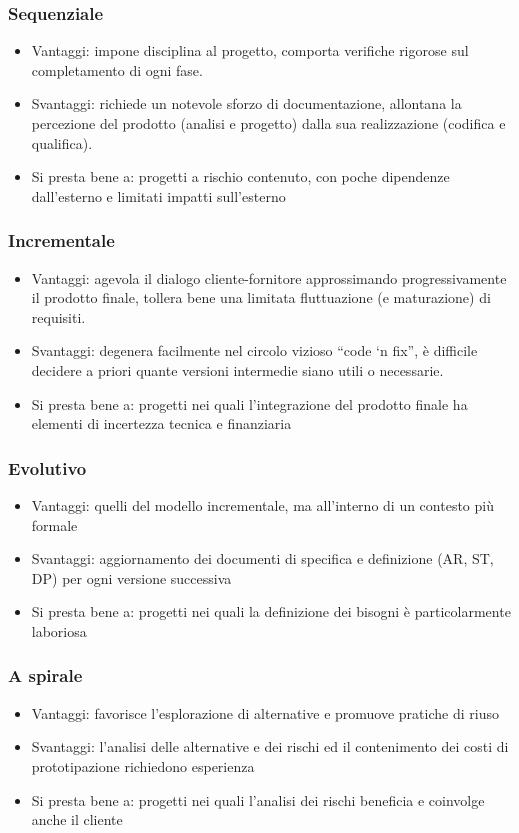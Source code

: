 \subsubsection{Sequenziale}
\begin{itemize}
\item Vantaggi: impone disciplina al progetto, comporta verifiche rigorose sul completamento di ogni fase.
\item Svantaggi: richiede un notevole sforzo di documentazione, allontana la percezione del prodotto (analisi e
progetto) dalla sua realizzazione (codifica e qualifica).
\item Si presta bene a: progetti a rischio contenuto, con poche dipendenze dall'esterno e limitati impatti
sull'esterno
\end{itemize}

\subsubsection{Incrementale}
\begin{itemize}
\item Vantaggi: agevola il dialogo cliente-fornitore approssimando progressivamente il prodotto finale, tollera bene una limitata fluttuazione (e maturazione) di requisiti.
\item Svantaggi: degenera facilmente nel circolo vizioso ``code ‘n fix'', è difficile decidere a priori quante versioni intermedie siano utili o necessarie.
\item Si presta bene a: progetti nei quali l'integrazione del prodotto finale ha elementi di incertezza tecnica e finanziaria
\end{itemize}

\subsubsection{Evolutivo}
\begin{itemize}
\item Vantaggi: quelli del modello incrementale, ma all'interno di un contesto più formale
\item Svantaggi: aggiornamento dei documenti di specifica e definizione (AR, ST, DP) per ogni versione successiva
\item Si presta bene a: progetti nei quali la definizione dei bisogni è particolarmente laboriosa
\end{itemize}

\subsubsection{A spirale}
\begin{itemize}
\item Vantaggi: favorisce l'esplorazione di alternative e promuove pratiche di riuso
\item Svantaggi: l'analisi delle alternative e dei rischi ed il contenimento dei costi di prototipazione richiedono esperienza
\item Si presta bene a: progetti nei quali l'analisi dei rischi beneficia e coinvolge anche il cliente
\end{itemize}

